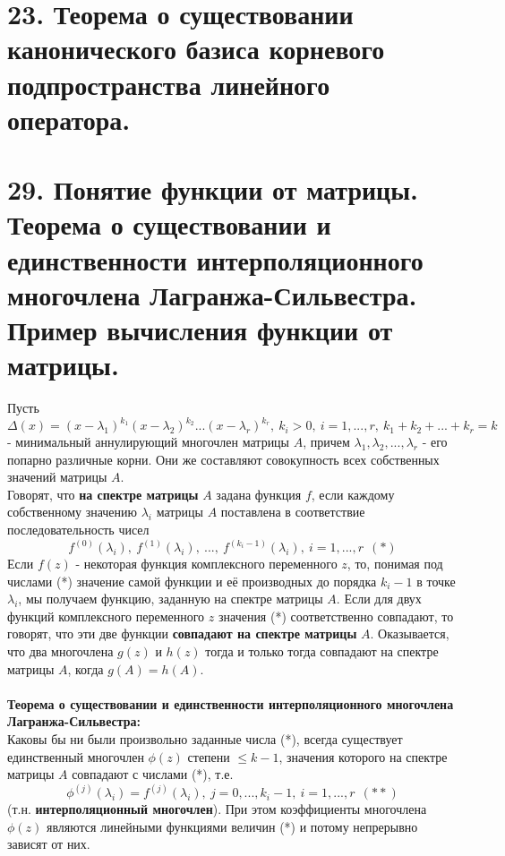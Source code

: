 \documentclass[14pt]{extarticle}
\begin{document}
\section{23.	
    Теорема о существовании канонического базиса корневого подпространства 
    линейного оператора.
}

\section{29.	
    Понятие функции от матрицы. Теорема о существовании и единственности 
    интерполяционного многочлена Лагранжа-Сильвестра. 
    Пример вычисления функции от матрицы.
}

Пусть $\Delta(x) = (x-\lambda_1)^{k_1} (x-\lambda_2)^{k_2} ... (x-\lambda_r)^{k_r}, 
\ k_i > 0, \ i = 1, ... , r, \ k_1 + k_2 + ... + k_r = k$ 
- минимальный аннулирующий многочлен матрицы $A$, причем 
$\lambda_1, \lambda_2, ... , \lambda_r$ - его попарно различные корни. 
Они же составляют совокупность всех собственных значений матрицы $A$. \\
Говорят, что \textbf{на спектре матрицы} $A$ задана функция $f$, если 
каждому собственному значению $\lambda_i$ матрицы $A$ поставлена в соответствие
последовательность чисел $$ f^{(0)} (\lambda_i), \ f^{(1)} (\lambda_i), \ ..., 
\ f^{(k_i - 1)} (\lambda_i), \ i = 1, ... , r \ \ (*)$$
Если $f(z)$ - некоторая функция комплексного переменного $z$, то, понимая 
под числами (*) значение самой функции и её производных до порядка $k_i - 1$
в точке $\lambda_i$, мы получаем функцию, заданную на спектре матрицы $A$. 
Если для двух функций комплексного переменного $z$ значения (*) соответственно 
совпадают, то говорят, что эти две функции \textbf{совпадают на спектре 
матрицы} $A$. Оказывается, что два многочлена $g(z)$ и $h(z)$ тогда и только 
тогда совпадают на спектре матрицы $A$, когда $g(A) = h(A)$.\\\\
\textbf{Теорема о существовании и единственности интерполяционного многочлена 
Лагранжа-Сильвестра:} \\
Каковы бы ни были произвольно заданные числа (*), 
всегда существует единственный многочлен $\phi(z)$ степени $\leq k - 1$, 
значения которого на спектре матрицы $A$ совпадают с числами (*), т.е. 
$$\phi^{(j)}(\lambda_i) = f^{(j)}(\lambda_i), \ j = 0, ... , k_i - 1, \
i = 1, ... , r \ \ (**)$$ (т.н. \textbf{интерполяционный многочлен}). 
При этом коэффициенты многочлена $\phi(z)$ являются
линейными функциями величин (*) и потому непрерывно зависят от них. \\
\end{document}

